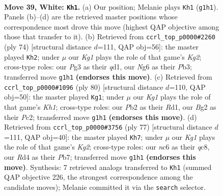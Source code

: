 \documentclass[11pt]{article}
\begin{document}
\clearpage

\begin{figure}[p]\centering
\begin{subfigure}{0.46\textwidth}\centering
\resizebox{\linewidth}{!}{%
\newchessgame
\chessboard[
  setfen={r7/1pk3p1/p1n2pN1/2Q3np/3R4/4P1P1/PPR2PBP/6K1 w - - 7 39},
  showmover=false,
  pgfstyle=straightmove, color=movearrow, markmove={g1-h1}
]}
\caption{}
\end{subfigure}\hfill
\begin{subfigure}{0.46\textwidth}\centering
\resizebox{\linewidth}{!}{%
\newchessgame
\chessboard[
  setfen={5r2/5p1k/p3p1pP/2p1QnP1/2P5/1PB3R1/P4PK1/3q4 w - - 8 38},
  showmover=false,
  pgfstyle=straightmove, color=movearrow, markmove={g2-h2}
]}
\caption{}
\end{subfigure}
\\[4pt]
\begin{subfigure}{0.46\textwidth}\centering
\resizebox{\linewidth}{!}{%
\newchessgame
\chessboard[
  setfen={2q5/3r2bk/2n3p1/1N1p1p1p/Pp2n3/1P4P1/2P1RBQP/3R3K w - - 8 41},
  showmover=false,
  pgfstyle=straightmove, color=movearrow, markmove={h1-g1}
]}
\caption{}
\end{subfigure}\hfill
\begin{subfigure}{0.46\textwidth}\centering
\resizebox{\linewidth}{!}{%
\newchessgame
\chessboard[
  setfen={2Q5/1p2r1k1/p3p3/3pNq1p/3P1b2/1P6/P4PP1/4R1K1 b - - 1 39},
  showmover=false,
  pgfstyle=straightmove, color=movearrow, markmove={g7-h7}
]}
\caption{}
\end{subfigure}
\caption{\textbf{Move 39, White: \texttt{Kh1}.} (a) Our position; Melanie plays \texttt{Kh1} (\texttt{g1h1}). Panels (b)--(d) are the retrieved master positions whose correspondence most drove this move (highest QAP objective among those that transfer to it). (b) Retrieved from \texttt{ccrl\_top\_p0000\#2260} (ply 74) [structural distance $d$=111, QAP obj=56]: the master played \texttt{Kh2}; under $\mu$ our \emph{Kg1} plays the role of that game's \emph{Kg2}; cross-type roles: our \emph{P}g3 as their \emph{q}d1, our \emph{N}g6 as their \emph{P}b3; transferred move \texttt{g1h1} \textbf{(endorses this move)}. (c) Retrieved from \texttt{ccrl\_top\_p0000\#1096} (ply 80) [structural distance $d$=110, QAP obj=50]: the master played \texttt{Kg1}; under $\mu$ our \emph{Kg1} plays the role of that game's \emph{Kh1}; cross-type roles: our \emph{P}b2 as their \emph{R}d1, our \emph{B}g2 as their \emph{P}c2; transferred move \texttt{g1h1} \textbf{(endorses this move)}. (d) Retrieved from \texttt{ccrl\_top\_p0000\#3756} (ply 77) [structural distance $d$=111, QAP obj=40]: the master played \texttt{Kh7}; under $\mu$ our \emph{Kg1} plays the role of that game's \emph{Kg2}; cross-type roles: our \emph{n}c6 as their \emph{q}c8, our \emph{R}d4 as their \emph{P}b7; transferred move \texttt{g1h1} \textbf{(endorses this move)}. Synthesis: 7 retrieved analogs transferred to \texttt{Kh1} (summed QAP objective 226, the strongest correspondence among the candidate moves); Melanie committed it via the \texttt{search} selector.}
\label{fig:thought-m76}
\end{figure}
\end{document}
